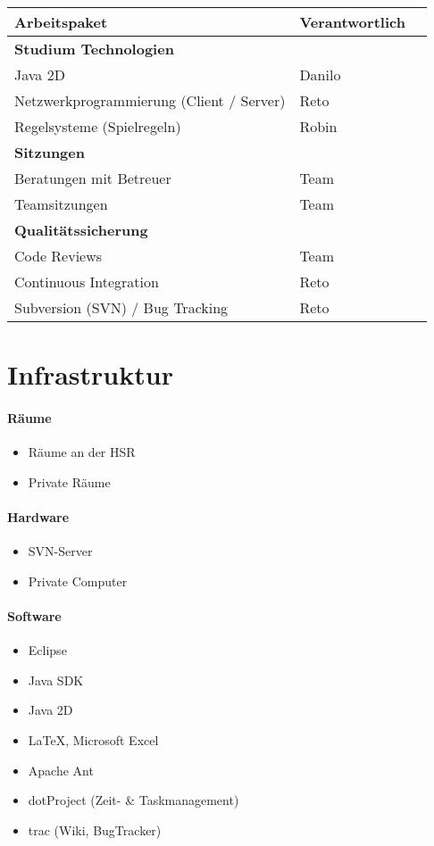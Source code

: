 \documentclass[a4paper,12pt,halfparskip,DIV14]{scrartcl}
\begin{document}
\begin{tabular}{@{} l l l @{}}
\toprule
Arbeitspaket & Verantwortlich \\
\midrule
\textbf{Studium Technologien} &  & \\
Java 2D & Danilo & \\
Netzwerkprogrammierung (Client / Server) & Reto & \\
Regelsysteme (Spielregeln) & Robin & \\
\midrule
\textbf{Sitzungen} &  & \\
Beratungen mit Betreuer & Team & \\
Teamsitzungen & Team & \\
\midrule
\textbf{Qualitätssicherung} &  & \\
Code Reviews & Team & \\
Continuous Integration & Reto & \\
Subversion (SVN) / Bug Tracking & Reto & \\
\bottomrule
\end{tabular}


\section{Infrastruktur}

\paragraph{Räume}
\begin{itemize}
	\item Räume an der HSR
	\item Private Räume
\end{itemize}

\paragraph{Hardware}
\begin{itemize}
	\item SVN-Server
	\item Private Computer
\end{itemize}

\paragraph{Software}
\begin{itemize}
	\item Eclipse
	\item Java SDK
	\item Java 2D
	\item \LaTeX{}, Microsoft Excel
	\item Apache Ant
	\item dotProject (Zeit- \& Taskmanagement)
	\item trac (Wiki, BugTracker)
\end{itemize}
\end{document}
